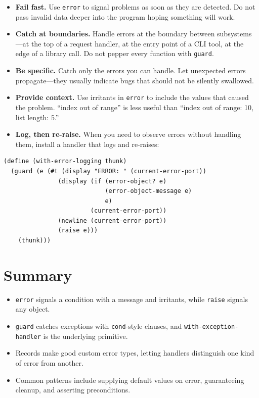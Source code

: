\begin{itemize}
    \item \textbf{Fail fast.} Use \texttt{error} to signal problems as soon as they are detected. Do not pass invalid data deeper into the program hoping something will work.
    \item \textbf{Catch at boundaries.} Handle errors at the boundary between subsystems---at the top of a request handler, at the entry point of a CLI tool, at the edge of a library call. Do not pepper every function with \texttt{guard}.
    \item \textbf{Be specific.} Catch only the errors you can handle. Let unexpected errors propagate---they usually indicate bugs that should not be silently swallowed.
    \item \textbf{Provide context.} Use irritants in \texttt{error} to include the values that caused the problem. ``index out of range'' is less useful than ``index out of range: 10, list length: 5.''
    \item \textbf{Log, then re-raise.} When you need to observe errors without handling them, install a handler that logs and re-raises:
\end{itemize}

\begin{lstlisting}
(define (with-error-logging thunk)
  (guard (e (#t (display "ERROR: " (current-error-port))
               (display (if (error-object? e)
                            (error-object-message e)
                            e)
                        (current-error-port))
               (newline (current-error-port))
               (raise e)))
    (thunk)))
\end{lstlisting}

\section*{Summary}

\begin{itemize}
    \item \texttt{error} signals a condition with a message and irritants, while \texttt{raise} signals any object.
    \item \texttt{guard} catches exceptions with \texttt{cond}-style clauses, and \texttt{with-exception-handler} is the underlying primitive.
    \item Records make good custom error types, letting handlers distinguish one kind of error from another.
    \item Common patterns include supplying default values on error, guaranteeing cleanup, and asserting preconditions.
\end{itemize}

